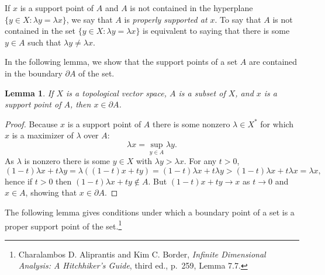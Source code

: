 \documentclass{article}
\newtheorem{lemma}[theorem]{Lemma}
\theoremstyle{definition}
\begin{document}
 If $x$ is a support point of $A$
and $A$ is not contained in the hyperplane $\{y \in X: \lambda y = \lambda x\}$, we say that $A$ is {\em properly supported at $x$}. 
To say that $A$ is not contained in the set $\{y \in X:\lambda y  = \lambda x\}$ is equivalent to saying that there is some $y \in A$ such that
$\lambda y \neq \lambda x$. 

In the following lemma, we show that the support points of a set $A$ are contained in the boundary $\partial A$ of the set.

\begin{lemma}
If $X$ is a topological vector space, $A$ is a subset of $X$, and $x$ is a support point of $A$, then $x \in \partial A$.
\label{boundarypoints}
\end{lemma}
\begin{proof}
Because $x$ is a support point of $A$ there is some nonzero $\lambda \in X^*$ for which $x$ is a maximizer of $\lambda$ over $A$:
\[
\lambda x = \sup_{y \in A} \lambda y.
\]
As $\lambda$ is nonzero there is some $y \in X$ with $\lambda y > \lambda x$. For  any $t>0$, 
\[
(1-t)\lambda x+t\lambda y=\lambda((1-t)x+ty) = (1-t)\lambda x + t\lambda y >(1-t)\lambda x + t \lambda x = \lambda x,
\]
hence if $t>0$ then $(1-t)\lambda x + t y \not \in A$. But $(1-t)x+ty \to x$ as $t \to 0$ and $x \in A$, showing that $x \in \partial A$.
\end{proof}


The following lemma gives conditions under which  a boundary point of a set is a proper support point of the set.\footnote{Charalambos D. Aliprantis and Kim C. Border, {\em Infinite Dimensional Analysis: A Hitchhiker's Guide}, third ed., p.~259, Lemma 7.7.} 
\end{document}
